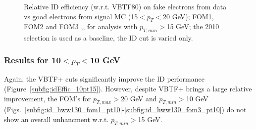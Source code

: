 \begin{figure}[!hbtp]
\caption{Relative ID efficiency (w.r.t. VBTF80) on fake electrons from data vs good electrons from signal MC  
(15$<p_T<$20 GeV);
FOM1, FOM2 and FOM3 ,, for analysis with  
$p_{T,min}>$15 GeV; the 2010 selection is used as a baseline, the ID cut is varied only.}
\label{fig:idpt15}
\end{figure}

\subsubsection{Results for 10$<p_T<$10 GeV}

Again, the VBTF+ cuts significantly improve the ID performance (Figure~\ref{subfig:idEffic_10pt15}).
However, despite VBTF+ brings a large relative improvement, the FOM's for $p_{T,max}>$20 GeV and $p_{T,min}>$10 GeV 
(Figs.~\ref{subfig:id_hww130_fom1_pt10}-\ref{subfig:id_hww130_fom3_pt10}) do not show an overall unhancment w.r.t. $p_{T,min}>$15 GeV.

